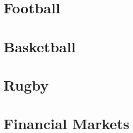 \documentclass[12pt]{report}
\begin{document}
\section{Football}


\section{Basketball}

%

\section{Rugby}

\section{Financial Markets}

%
%
\end{document}
